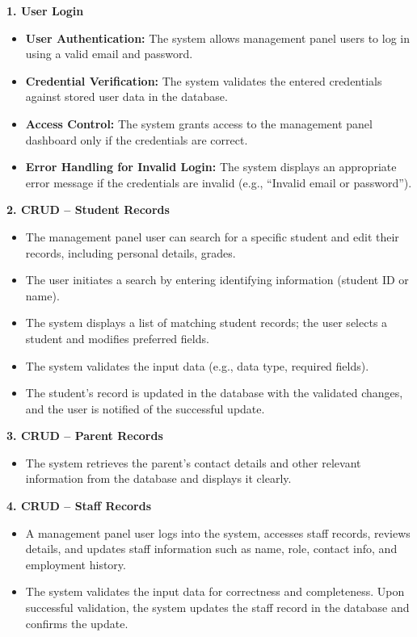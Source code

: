 \documentclass[12pt, a4paper]{report}
\begin{document}
\textbf{1. User Login}
\begin{itemize}
    \item \textbf{User Authentication:} The system allows management panel users to log in using a valid email and password.
    \item \textbf{Credential Verification:} The system validates the entered credentials against stored user data in the database.
    \item \textbf{Access Control:} The system grants access to the management panel dashboard only if the credentials are correct.
    \item \textbf{Error Handling for Invalid Login:} The system displays an appropriate error message if the credentials are invalid (e.g., ``Invalid email or password'').
\end{itemize}

\textbf{2. CRUD -- Student Records}
\begin{itemize}
    \item The management panel user can search for a specific student and edit their records, including personal details, grades.
    \item The user initiates a search by entering identifying information (student ID or name).
    \item The system displays a list of matching student records; the user selects a student and modifies preferred fields.
    \item The system validates the input data (e.g., data type, required fields).
    \item The student's record is updated in the database with the validated changes, and the user is notified of the successful update.
\end{itemize}

\textbf{3. CRUD -- Parent Records}
\begin{itemize}
    \item The system retrieves the parent's contact details and other relevant information from the database and displays it clearly.
\end{itemize}

\textbf{4. CRUD -- Staff Records}
\begin{itemize}
    \item A management panel user logs into the system, accesses staff records, reviews details, and updates staff information such as name, role, contact info, and employment history.
    \item The system validates the input data for correctness and completeness. Upon successful validation, the system updates the staff record in the database and confirms the update.
\end{itemize}
\end{document}

